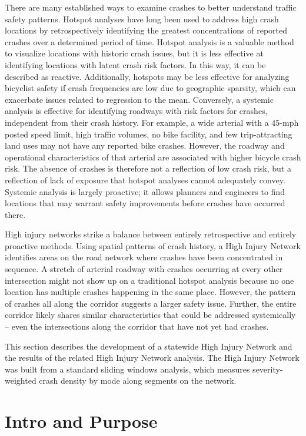 \documentclass[
  letterpaper,
]{scrbook}
\begin{document}
There are many established ways to examine crashes to better understand
traffic safety patterns. Hotspot analyses have long been used to address
high crash locations by retrospectively identifying the greatest
concentrations of reported crashes over a determined period of time.
Hotspot analysis is a valuable method to visualize locations with
historic crash issues, but it is less effective at identifying locations
with latent crash risk factors. In this way, it can be described as
reactive. Additionally, hotspots may be less effective for analyzing
bicyclist safety if crash frequencies are low due to geographic
sparsity, which can exacerbate issues related to regression to the mean.
Conversely, a systemic analysis is effective for identifying roadways
with risk factors for crashes, independent from their crash history. For
example, a wide arterial with a 45-mph posted speed limit, high traffic
volumes, no bike facility, and few trip-attracting land uses may not
have any reported bike crashes. However, the roadway and operational
characteristics of that arterial are associated with higher bicycle
crash risk. The absence of crashes is therefore not a reflection of low
crash risk, but a reflection of lack of exposure that hotspot analyses
cannot adequately convey. Systemic analysis is largely proactive; it
allows planners and engineers to find locations that may warrant safety
improvements before crashes have occurred there.

High injury networks strike a balance between entirely retrospective and
entirely proactive methods. Using spatial patterns of crash history, a
High Injury Network identifies areas on the road network where crashes
have been concentrated in sequence. A stretch of arterial roadway with
crashes occurring at every other intersection might not show up on a
traditional hotspot analysis because no one location has multiple
crashes happening in the same place. However, the pattern of crashes all
along the corridor suggests a larger safety issue. Further, the entire
corridor likely shares similar characteristics that could be addressed
systemically -- even the intersections along the corridor that have not
yet had crashes.

This section describes the development of a statewide High Injury
Network and the results of the related High Injury Network analysis. The
High Injury Network was built from a standard sliding windows analysis,
which measures severity-weighted crash density by mode along segments on
the network.

\hypertarget{intro-and-purpose}{%
\chapter{Intro and Purpose}\label{intro-and-purpose}}
\end{document}
